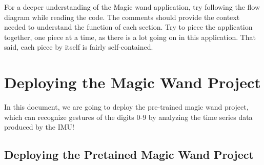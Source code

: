     For a deeper understanding of the Magic wand application, try following the flow diagram while reading the code. The comments should provide the context needed to understand the function of each section. Try to piece the application together, one piece at a time, as there is a lot going on in this application. That said, each piece by itself is fairly self-contained.    
    
\section{Deploying the Magic Wand Project}

    In this document, we are going to deploy the pre-trained magic wand project, which can recognize gestures of the digits 0-9 by analyzing the time series data produced by the IMU!
    
\subsection{Deploying the Pretained Magic Wand Project}

